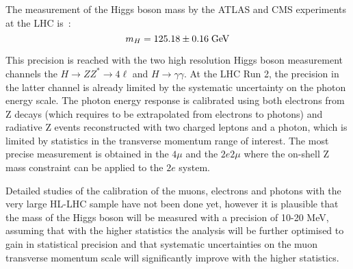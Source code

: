 The measurement of the Higgs boson mass by the ATLAS and CMS
experiments at the LHC is~\cite{Tanabashi:2018oca}: $$m_H = 125.18 \pm
0.16 \; \rm GeV$$

This precision is reached with the two high resolution Higgs boson
measurement channels the $H\rightarrow ZZ^* \rightarrow 4\ell$ and
$H\rightarrow \gamma \gamma$. At the LHC Run 2, the precision in the
latter channel is already limited by the systematic uncertainty on the
photon energy scale. The photon energy response is calibrated using
both electrons from Z decays (which requires to be extrapolated from
electrons to photons) and radiative Z events reconstructed with two
charged leptons and a photon, which is limited by statistics in the
transverse momentum range of interest. The most precise measurement is
obtained in the $4\mu$ and the $2e2\mu$ where the on-shell Z mass
constraint can be applied to the $2e$ system. 


Detailed studies of the calibration of the muons, electrons and
photons with the very large HL-LHC sample have not been done yet,
however it is plausible that the mass of the Higgs boson will be
measured with a precision of 10-20 MeV, assuming that with the higher
statistics the analysis will be further optimised to gain in
statistical precision and that systematic uncertainties on the muon
transverse momentum scale will significantly improve with the higher
statistics.
